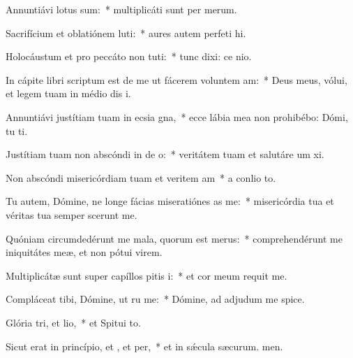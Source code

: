 \item Annuntiávi  lotus sum:~* multiplicáti sunt per merum.
\item Sacrifícium et oblatiónem luti:~* aures autem perfeti hi.
\item Holocáustum et pro peccáto non tuti:~* tunc dixi: ce nio.
\item In cápite libri scriptum est de me ut fácerem voluntem am:~* Deus meus, vólui, et legem tuam in médio dis i.
\item Annuntiávi justítiam tuam in ecsia gna,~* ecce lábia mea non prohibébo: Dómi, tu ti.
\item Justítiam tuam non abscóndi in de o:~* veritátem tuam et salutáre um xi.
\item Non abscóndi misericórdiam tuam et veritem am~* a conlio to.
\item Tu autem, Dómine, ne longe fácias miseratiónes as  me:~* misericórdia tua et véritas tua semper scerunt me.
\item Quóniam circumdedérunt me mala, quorum  est merus:~* comprehendérunt me iniquitátes meæ, et non pótui  virem.
\item Multiplicátæ sunt super capíllos pitis i:~* et cor meum requit me.
\item Compláceat tibi, Dómine, ut ru me:~* Dómine, ad adjudum me spice.
\item Glória tri, et lio,~* et Spitui to.
\item Sicut erat in princípio, et , et per,~* et in sǽcula sæcurum. men.
